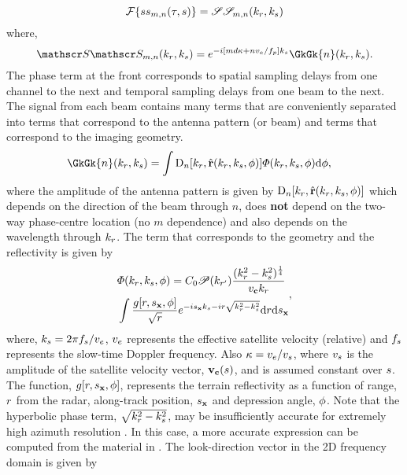 \documentclass[journal]{IEEEtran}
\newcommand{\prf}{\ensuremath{f_p}}
\newcommand{\phaseSep}{\ensuremath{d}}
\begin{document}
\begin{equation}
 \mathcal{F}\{ss_{m,n}(\tau, s)\} = \mathscr{S}\mathscr{S}_{m,n}(k_r, k_{s})
\end{equation}
where,
\begin{equation}
 \SkSk{m,n}(\kveczero) = \eex{-\im [m\phaseSep\kappa+n\effrelvel/\prf]\kparm}\GkGk{n}(\kveczero).
 \label{eq:signalModel}
\end{equation}
The phase term at the front corresponds to spatial sampling delays from one channel to the next and temporal sampling delays from one beam to the next. The signal from each beam contains many terms that are conveniently separated into terms that correspond to the antenna pattern (or beam) and terms that correspond to the imaging geometry.
\begin{equation}
\begin{split}
 &\GkGk{n}(\kveczero) = \int\dPattern{n}[\kr,\uRangeVector{\kveczero, \targetdepression}]\vkern(\kr,\kparm,\depression)\d\depression,
 \end{split}
 \label{eq:stripSAR3d}
\end{equation}
where the amplitude of the antenna pattern is given by $\text{D}_{n}[k_r,\hat{\mathbf{r}}(k_r, k_{s}, \phi)]$ which depends on the direction of the beam through $n$, does {\bf not} depend on the two-way phase-centre location (no $m$ dependence) and also depends on the wavelength through $k_r$. The term that corresponds to the geometry and the reflectivity is given by
\begin{equation}
\begin{split}
 &\vkern(\kveczero, \depression) = C_0\Snvelope(\krc)\frac{(\kr^2-\kparm^2)^{\frac{1}{4}}}{v_\sat\kr}\\
 &\int\frac{\reflectivity[\targetrange, \targetxparm, \depression]}{\sqrt{\targetrange}}\eex{-\im \targetxparm\kparm-\im \targetrange\sqrt{\kr^2-\kparm^2}}\d\targetrange\d\targetxparm
 \end{split},
 \label{eq:vparm}
\end{equation} 
where, $k_{s}=2\pi f_{s}/v_e$, $v_e$ represents the effective satellite velocity (relative) and $f_{s}$ represents the slow-time Doppler frequency. Also $\kappa = v_e/\mathnormal{v}_s$, where $\mathnormal{v}_s$ is the amplitude of the satellite velocity vector, $\mathbf{v}_{\mathbf{c}}(s)$, and is assumed constant over $s$.  The function, $g[r, s_{\mathbf{x}}, \phi]$, represents the terrain reflectivity as a function of range, $r$ from the radar, along-track position, $s_{\mathbf{x}}$ and depression angle, $\phi$. Note that the hyperbolic phase term, $\sqrt{k_r^2-k_{s}^2}$, may be insufficiently accurate for extremely high azimuth resolution \cite{Mittermayer}. In this case, a more accurate expression can be computed from the material in \cite{NovelRadar}. The look-direction vector in the 2D frequency domain is given by
\end{document}
